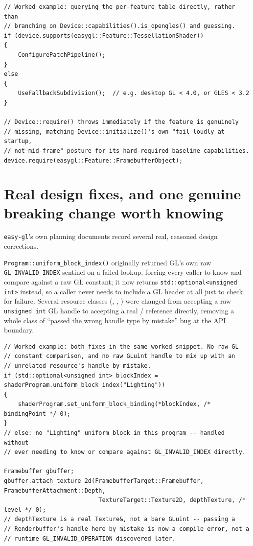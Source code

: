 \begin{lstlisting}
// Worked example: querying the per-feature table directly, rather than
// branching on Device::capabilities().is_opengles() and guessing.
if (device.supports(easygl::Feature::TessellationShader))
{
    ConfigurePatchPipeline();
}
else
{
    UseFallbackSubdivision();  // e.g. desktop GL < 4.0, or GLES < 3.2
}

// Device::require() throws immediately if the feature is genuinely
// missing, matching Device::initialize()'s own "fail loudly at startup,
// not mid-frame" posture for its hard-required baseline capabilities.
device.require(easygl::Feature::FramebufferObject);
\end{lstlisting}

\section{Real design fixes, and one genuine breaking change worth knowing}

\texttt{easy-gl}'s own planning documents record several real, reasoned design corrections.

\texttt{Program::uniform\_block\_index()} originally returned GL's own raw
\texttt{GL\_INVALID\_INDEX} sentinel on a failed lookup, forcing every caller to know and
compare against a raw GL constant; it now returns \texttt{std::optional<unsigned int>}
instead, so a caller never needs to include a GL header at all just to check for failure.
Several resource classes (, ,
) were changed from accepting a raw \texttt{unsigned int} GL
handle to accepting a real  /  reference directly, removing
a whole class of ``passed the wrong handle type by mistake'' bug at the API boundary.

\begin{lstlisting}
// Worked example: both fixes in the same worked snippet. No raw GL
// constant comparison, and no raw GLuint handle to mix up with an
// unrelated resource's handle by mistake.
if (std::optional<unsigned int> blockIndex = shaderProgram.uniform_block_index("Lighting"))
{
    shaderProgram.set_uniform_block_binding(*blockIndex, /* bindingPoint */ 0);
}
// else: no "Lighting" uniform block in this program -- handled without
// ever needing to know or compare against GL_INVALID_INDEX directly.

Framebuffer gbuffer;
gbuffer.attach_texture_2d(FramebufferTarget::Framebuffer, FramebufferAttachment::Depth,
                           TextureTarget::Texture2D, depthTexture, /* level */ 0);
// depthTexture is a real Texture&, not a bare GLuint -- passing a
// Renderbuffer's handle here by mistake is now a compile error, not a
// runtime GL_INVALID_OPERATION discovered later.
\end{lstlisting}

